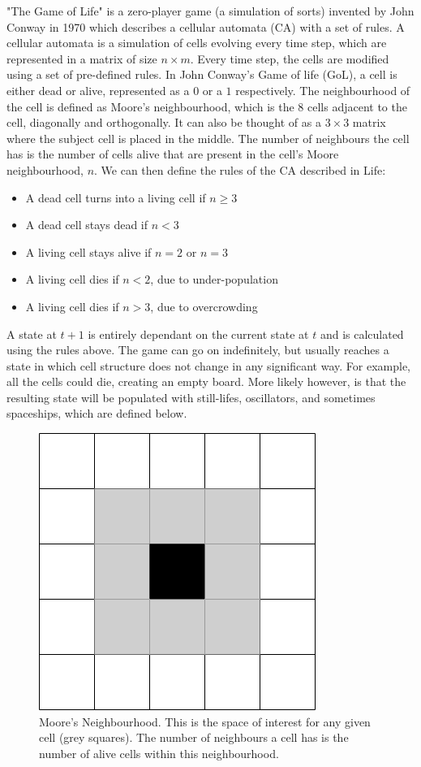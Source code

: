 \documentclass{l4proj}
\begin{document}
"The Game of Life" is a zero-player game (a simulation of sorts) invented by John Conway in 1970 which describes a cellular automata (CA) with a set of rules. A cellular automata is a simulation of cells evolving every time step, which are represented in a matrix of size $n\times m$. Every time step, the cells are modified using a set of pre-defined rules. In John Conway's Game of life (GoL), a cell is either dead or alive, represented as a $0$ or a $1$ respectively. The neighbourhood of the cell is defined as Moore's neighbourhood, which is the 8 cells adjacent to the cell, diagonally and orthogonally. It can also be thought of as a $3\times 3$ matrix where the subject cell is placed in the middle. The number of neighbours the cell has is the number of cells alive that are present in the cell's Moore neighbourhood, $n$. We can then define the rules of the CA described in Life:

\begin{itemize}
    \item A dead cell turns into a living cell if $n \geq 3$
    \item A dead cell stays dead if $n < 3$
    \item A living cell stays alive if $n = 2$ or $n = 3$
    \item A living cell dies if $n < 2$, due to under-population
    \item A living cell dies if $n > 3$, due to overcrowding
\end{itemize}

A state at $t+1$ is entirely dependant on the current state at $t$ and is calculated using the rules above. The game can go on indefinitely, but usually reaches a state in which cell structure does not change in any significant way. For example, all the cells could die, creating an empty board. More likely however, is that the resulting state will be populated with still-lifes, oscillators, and sometimes spaceships, which are defined below.

\begin{figure}[h]
\centering
\includegraphics[width=0.4\linewidth]{dissertation/images/diagrams/moores_neighbourhood.png}
\caption{Moore's Neighbourhood. This is the space of interest for any given cell (grey squares). The number of neighbours a cell has is the number of alive cells within this neighbourhood.}
\label{fig:subim1}

\end{figure}
\end{document}
